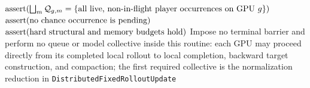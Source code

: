 \documentclass[10pt,varwidth=190mm,border=1mm]{standalone}
\newcommand{\Qready}[1]{\mathcal Q_{#1}}
\begin{document}
\begin{algorithm}[H]
{{    $\operatorname{assert}(\bigsqcup_m\Qready{g,m}
      =\{\textnormal{all live, non-in-flight player occurrences on GPU }g\})$\;
    $\operatorname{assert}(\textnormal{no chance occurrence is pending})$\;
    $\operatorname{assert}(\textnormal{hard structural and memory budgets hold})$\;
  }
}
Impose no terminal barrier and perform no queue or model collective inside this
routine: each GPU may proceed directly from its completed local rollout to local
completion, backward target construction, and compaction; the first required
collective is the normalization reduction in
\texttt{DistributedFixedRolloutUpdate}\;
\;
\end{algorithm}
\end{document}
